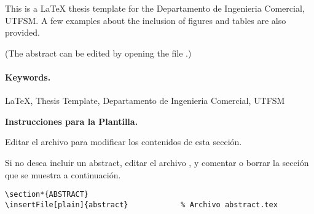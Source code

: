 
This is a \LaTeX{} thesis template for the Departamento de Ingenieria Comercial, UTFSM. A few examples about the inclusion of figures and tables are also provided.

(The abstract can be edited by opening the file .)

\vspace{20mm}

\paragraph{Keywords.}
\LaTeX{}, Thesis Template, Departamento de Ingenieria Comercial, UTFSM

\vspace{20mm}


\begin{framed}
\noindent\textbf{Instrucciones para la Plantilla.}

Editar el archivo  para modificar los contenidos de esta sección.

Si no desea incluir un abstract, editar el archivo , y comentar o borrar la sección que se muestra a continuación.

\begin{Verbatim}[frame=lines, label=\inlinecode{/memoria.tex} (extracto)
				, fontsize=\footnotesize
				, baselinestretch=1
				, formatcom=\color{gray}]
\section*{ABSTRACT}
\insertFile[plain]{abstract}			% Archivo abstract.tex
\end{Verbatim}

\end{framed}
